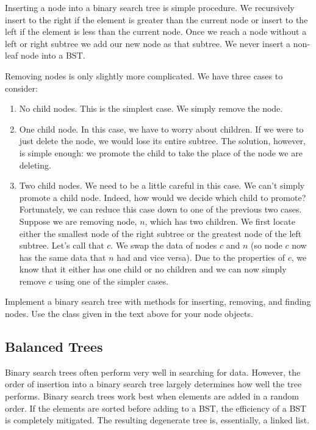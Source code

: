 Inserting a node into a binary search tree is simple procedure.
We recursively insert to the right if the element is greater than the current node
or insert to the left if the element is less than the current node.
Once we reach a node without a left or right subtree we add our new node as that subtree.
We never insert a non-leaf node into a BST.

Removing nodes is only slightly more complicated.
We have three cases to consider:
\begin{enumerate}
\item No child nodes.  This is the simplest case.  We simply remove the node.
\item One child node.  In this case, we have to worry about children.
If we were to just delete the node, we would lose its entire subtree.
The solution, however, is simple enough:
we promote the child to take the place of the node we are deleting.
\item Two child nodes.  We need to be a little careful in this case.
We can't simply promote a child node.  Indeed, how would we decide which child to promote?
Fortunately, we can reduce this case down to one of the previous two cases.
Suppose we are removing node, $n$, which has two children.
We first locate either the smallest node of the right subtree or the greatest node of the left subtree.
Let's call that $c$.
We swap the data of nodes $c$ and $n$ (so node $c$ now has the same data that $n$ had and vice versa).
Due to the properties of $c$, we know that it either has one child or no children and we can now simply remove $c$ using one of the simpler cases.
\end{enumerate}

\begin{problem}
Implement a binary search tree with methods for inserting, removing, and finding nodes.
Use the  class given in the text above for your node objects.
\end{problem}

\subsection*{Balanced Trees}
Binary search trees often perform very well in searching for data.
However, the order of insertion into a binary search tree largely determines how well the tree performs.
Binary search trees work best when elements are added in a random order.
If the elements are sorted before adding to a BST, the efficiency of a BST is completely mitigated.
The resulting degenerate tree is, essentially, a linked list.


